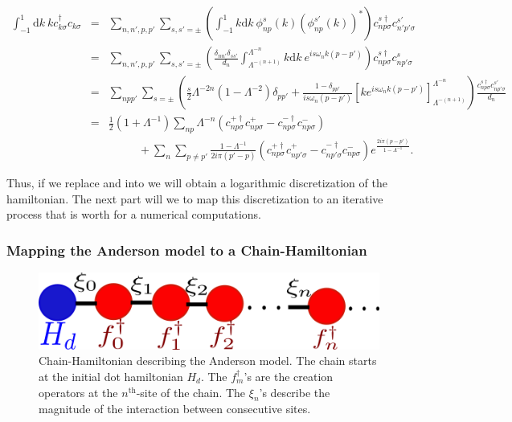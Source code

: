 \begin{eqnarray}
\int_{-1}^{1}\mbox{d}k\ kc_{k\sigma}^{\dagger}c_{k\sigma} & = & \sum_{n,n',p,p'}\sum_{s,s'=\pm}\left(\int_{-1}^{1}k\mbox{d}k\ \phi_{np}^{s}(k)\left(\phi_{np}^{s'}(k)\right)^{*}\right)c_{np\sigma}^{s\dagger}c_{n'p'\sigma}^{s'}\nonumber \\
 & = & \sum_{n,n',p,p'}\sum_{s,s'=\pm}\left(\frac{\delta_{nn'}\delta_{ss'}}{d_{n}}\int_{\Lambda^{-(n+1)}}^{\Lambda^{-n}}k\mbox{d}k\ e^{is\omega_{n}k\left(p-p'\right)}\right)c_{np\sigma}^{s\dagger}c_{np'\sigma}^{s}\nonumber \\
 & = & \sum_{npp'}\sum_{s=\pm}\left(\frac{s}{2}\Lambda^{-2n}\left(1-\Lambda^{-2}\right)\delta_{pp'}+\frac{1-\delta_{pp'}}{is\omega_{n}\left(p-p'\right)}\left[ke^{is\omega_{n}k\left(p-p'\right)}\right]_{\Lambda^{-(n+1)}}^{\Lambda^{-n}}\right)\frac{c_{np\sigma}^{s\dagger}c_{np'\sigma}^{s'}}{d_{n}}\nonumber \\
 & = & \frac{1}{2}\left(1+\Lambda^{-1}\right)\sum_{np}\Lambda^{-n}\left(c_{np\sigma}^{+\dagger}c_{np\sigma}^{+}-c_{np\sigma}^{-\dagger}c_{np\sigma}^{-}\right)\nonumber \\
 &  & \ \ \ \ \ \ \!\ \ \ \ \!\ \ +\sum_{n}\sum_{p\neq p'}\frac{1-\Lambda^{-1}}{2i\pi\left(p'-p\right)}\left(c_{np\sigma}^{+\dagger}c_{np'\sigma}^{+}-c_{np'\sigma}^{-\dagger}c_{np\sigma}^{-}\right)e^{\frac{2i\pi\left(p-p'\right)}{1-\Lambda^{-1}}}.\label{eq:second-integral}
\end{eqnarray}


Thus, if we replace  and 
into  we will obtain a logarithmic discretization
of the hamiltonian. The next part will we to map this discretization
to an iterative process that is worth for a numerical computations. 

\subsubsection{Mapping the Anderson model to a Chain-Hamiltonian}

\begin{figure}[h]
\centering
\includegraphics[scale=0.5]{IMAGES/NRGchain.png}\caption{\label{FigNRG-chain} Chain-Hamiltonian describing the Anderson model.
The chain starts at the initial dot hamiltonian $H_{d}$. The $f_{m}^{\dagger}$'s
are the creation operators at the $n^{\mbox{th}}$-site of the chain.
The $\xi_{n}$'s describe the magnitude of the interaction between
consecutive sites. }
\end{figure}


